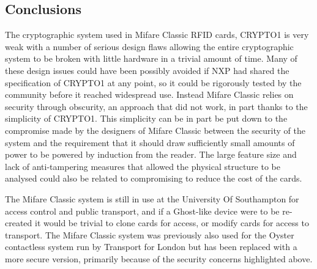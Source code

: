 \documentclass[pdflatex, a4paper,12pt]{article}
\begin{document}
\subsection{Conclusions}

The cryptographic system used in Mifare Classic RFID cards, CRYPTO1 is very
weak with a number of serious design flaws allowing the entire cryptographic
system to be broken with little hardware in a trivial amount of time. Many of
these design issues could have been possibly avoided if NXP had shared the specification of
CRYPTO1 at any point, so it could be rigorously tested by the community before
it reached widespread use. Instead Mifare Classic relies on security through
obscurity, an approach that did not work, in part thanks to the simplicity of
CRYPTO1. This simplicity can be in part be put down to the compromise made by
the designers of Mifare Classic between the security of the system and the
requirement that it should draw sufficiently small amounts of power to be
powered by induction from the reader. The large feature size and lack of
anti-tampering measures that allowed the
physical structure to be analysed could also be related to compromising to
reduce the cost of the cards.

The Mifare Classic system is still in use at the University Of Southampton for
access control and public transport, and if a Ghost-like device were to be
re-created it would be trivial to clone cards for access, or modify cards for
access to transport. The Mifare Classic system was previously also used for the
Oyster contactless system run by Transport for London but has been replaced
with a more secure version, primarily because of the security concerns
highlighted above.


{}
\end{document}
